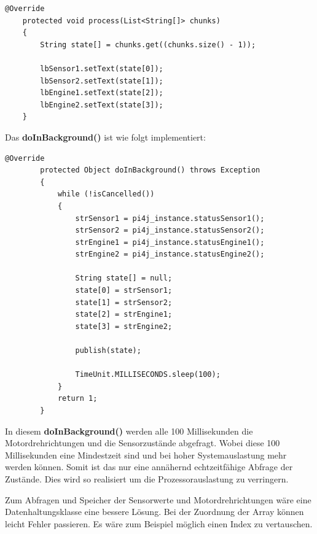 \begin{lstlisting}[style=JavaStyle, caption= Label aktualisieren]
	@Override
	protected void process(List<String[]> chunks)
	{
		String state[] = chunks.get((chunks.size() - 1));
            
		lbSensor1.setText(state[0]);
		lbSensor2.setText(state[1]);
		lbEngine1.setText(state[2]);
		lbEngine2.setText(state[3]);
	} 
\end{lstlisting}
Das \textbf{doInBackground()} ist wie folgt implementiert:
\begin{lstlisting}[style=JavaStyle, caption= Motor- und Sensorzustände, label=SwingWorker_MotorSensorStatus]
	@Override
        protected Object doInBackground() throws Exception
        {                        
            while (!isCancelled())
            {
                strSensor1 = pi4j_instance.statusSensor1();
                strSensor2 = pi4j_instance.statusSensor2();
                strEngine1 = pi4j_instance.statusEngine1();
                strEngine2 = pi4j_instance.statusEngine2();
                
                String state[] = null;
                state[0] = strSensor1;
                state[1] = strSensor2;
                state[2] = strEngine1;
                state[3] = strEngine2;
                
                publish(state);
                
                TimeUnit.MILLISECONDS.sleep(100);
            } 
            return 1;            
        }

\end{lstlisting}
In diesem \textbf{doInBackground()} werden  alle 100 Millisekunden die Motordrehrichtungen und die Sensorzustände abgefragt. Wobei diese 100 Millisekunden eine Mindestzeit sind und bei hoher Systemauslastung mehr werden können. Somit ist das nur eine annähernd echtzeitfähige Abfrage der Zustände. Dies wird so realisiert um die Prozessorauslastung zu verringern.

\vspace{10pt}

Zum Abfragen und Speicher der Sensorwerte und Motordrehrichtungen wäre eine Datenhaltungsklasse eine bessere Lösung. Bei der Zuordnung der Array können leicht Fehler passieren. Es wäre zum Beispiel möglich einen Index zu vertauschen.

\newpage

